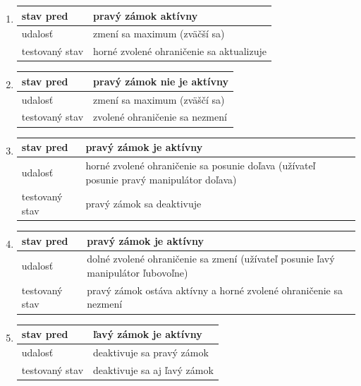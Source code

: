 \documentclass[
  digital, %
  twoside, %
  notable,   %
  nolof,   %
  nolot,   %
]{fithesis3}
\begin{document}
\begin{enumerate}
  \item
  \begin{tabular}{ | p{2.75cm} | p{8cm} | }
    \hline
    stav pred & pravý zámok aktívny \\ \hline
    udalosť & zmení sa maximum (zväčší sa)\\ \hline
    testovaný stav & horné zvolené ohraničenie sa aktualizuje \\ \hline
  \end{tabular}

  \item
  \begin{tabular}{ | p{2.75cm} | p{8cm} | }
    \hline
    stav pred & pravý zámok nie je aktívny \\ \hline
    udalosť & zmení sa maximum (zväščí sa)\\ \hline
    testovaný stav & zvolené ohraničenie sa nezmení \\ \hline
  \end{tabular}

  \item
  \begin{tabular}{ | p{2.75cm} | p{8cm} | }
    \hline
    stav pred & pravý zámok je aktívny \\ \hline
    udalosť & horné zvolené ohraničenie sa posunie doľava (užívateľ posunie pravý manipulátor doľava)\\ \hline
    testovaný stav & pravý zámok sa deaktivuje \\ \hline
  \end{tabular}

  \item
  \begin{tabular}{ | p{2.75cm} | p{8cm} | }
    \hline
    stav pred & pravý zámok je aktívny \\ \hline
    udalosť & dolné zvolené ohraničenie sa zmení (užívateľ posunie ľavý manipulátor ľubovoľne)\\ \hline
    testovaný stav & pravý zámok ostáva aktívny a horné zvolené ohraničenie sa nezmení \\ \hline
  \end{tabular}

  \item
  \begin{tabular}{ | p{2.75cm} | p{8cm} | }
    \hline
    stav pred & ľavý zámok je aktívny \\ \hline
    udalosť & deaktivuje sa pravý zámok \\ \hline
    testovaný stav & deaktivuje sa aj ľavý zámok \\ \hline
  \end{tabular}


\end{enumerate}
\end{document}
